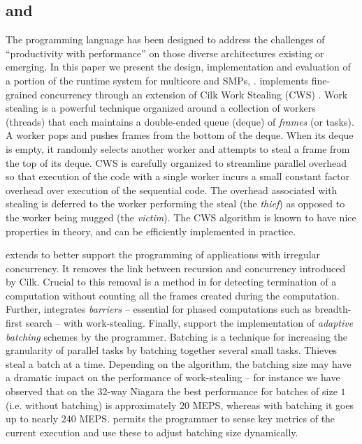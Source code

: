 \subsection{\Xten{} and \XWS}
The \Xten{} programming language \cite{x10} has
been designed to address the challenges of ``productivity with
performance'' on those diverse architectures existing or emerging.  In this paper we
present the design, implementation and evaluation of a portion of the
\Xten{} runtime system for multicore and SMPs, \XWS{}. \XWS{}
implements fine-grained concurrency through an extension of Cilk Work
Stealing (CWS) \cite{BJKLRZ95}.  Work stealing is a powerful technique
organized around a collection of workers (threads) that each
maintains a double-ended queue (deque) of {\em frames} (or tasks). A
worker pops and pushes frames from the bottom of the deque. When its
deque is empty, it randomly selects another worker and attempts to
steal a frame from the top of its deque. CWS is carefully organized to
streamline parallel overhead so that execution of the code with a
single worker incurs a small constant factor overhead over execution
of the sequential code. The overhead associated with stealing is
deferred to the worker performing the steal (the {\em thief}) as
opposed to the worker being mugged (the {\em victim}). The CWS
algorithm is known to have nice properties in theory, and can be
efficiently implemented in practice.

\XWS{} extends \CWS{} to better support the programming of
applications with irregular concurrency. It removes the link between
recursion and concurrency introduced by Cilk. Crucial to this removal
is a method in \XWS{} for detecting termination of a computation
without counting all the frames created during the computation.
Further, \XWS{} integrates {\em barriers} -- essential for phased
computations such as breadth-first search -- with
work-stealing. Finally, \XWS{} support the implementation of {\em
adaptive batching} schemes by the programmer. Batching is a technique
for increasing the granularity of parallel tasks by batching together
several small tasks. Thieves steal a batch at a time. Depending on the
algorithm, the batching size may have a dramatic impact on the
performance of work-stealing -- for instance we have observed that on
the 32-way Niagara the best performance for batches of size $1$
(i.e.{} without batching) is approximately $20$ MEPS, whereas with batching it goes up to nearly $240$ MEPS.
\XWS{} permits the programmer to sense key metrics of the current
execution and use these to adjust batching size dynamically.

